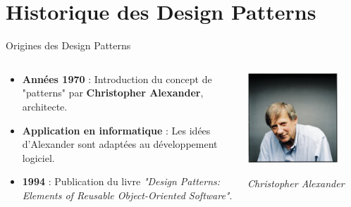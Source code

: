 \documentclass[aspectratio=169]{beamer}
\begin{document}

\section{Historique des Design Patterns}
\begin{frame}{Origines des Design Patterns}
    \begin{columns}
        \begin{column}{0.6\textwidth}
            \begin{itemize}
                \item \textbf{Années 1970} : Introduction du concept de "patterns" par \textbf{Christopher Alexander}, architecte.
                \item \textbf{Application en informatique} : Les idées d'Alexander sont adaptées au développement logiciel.
                \item \textbf{1994} : Publication du livre \textit{"Design Patterns: Elements of Reusable Object-Oriented Software"}.
            \end{itemize}
        \end{column}
        \begin{column}{0.4\textwidth}
            \includegraphics[width=0.8\textwidth]{pic/christopher_alexander.jpg}
            \begin{center}
                \small{\textit{Christopher Alexander}}
            \end{center}
        \end{column}
    \end{columns}
\end{frame}
\end{document}
